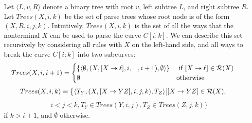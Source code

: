 \documentclass{article}
\begin{document}
Let $\langle L,v,R\rangle$ denote a binary tree with root $v$, left
subtree $L$, and right subtree $R$. Let $Trees(X,i,k)$ be the set of
parse trees whose root node is of the form $(X,R,i,j,k)$. Intuitively,
$Trees(X,i,k)$ is the set of all the ways that the nonterminal $X$ can
be used to parse the curve $C[i:k]$. We can describe this set
recursively by considering all rules with $X$ on the left-hand side,
and all ways to break the curve $C[i:k]$ into two subcurves:
\begin{align*}
\label{recursive-trees}
Trees(X,i,i+1) &= \begin{cases}
\{ \langle \emptyset, (X, [X\to \ell],i,\bot,i+1), \emptyset\rangle\} &
\mbox{ if } [X \to \ell] \in {\mathcal R}(X)\\
\emptyset & \mbox{otherwise}\end{cases}
\end{align*}
\begin{align}
Trees(X,i,k) = \big\{ &\langle T_Y, (X, [X\to YZ], i, j, k), T_Z \rangle \big| [X\to YZ] \in {\mathcal R}(X), 
\end{align}\begin{align*}
&i < j < k, T_Y\in Trees(Y,i,j), T_Z\in Trees(Z,j,k)\big\}
\end{align*}
if $k > i+1$, and $\emptyset$ otherwise.
\end{document}
